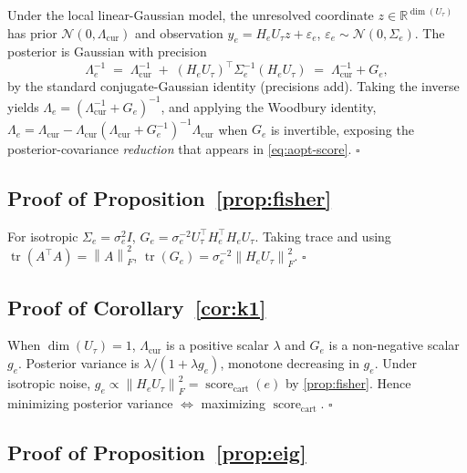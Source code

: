 \documentclass{article}
\newcommand{\scorecart}{\operatorname{score}_{\mathrm{cart}}}
\newcommand{\tr}{\operatorname{tr}}
\newcommand{\real}{\mathbb{R}}
\newcommand{\norm}[1]{\left\lVert #1 \right\rVert}
\theoremstyle{plain}
\theoremstyle{definition}
\theoremstyle{remark}
\begin{document}
Under the local linear-Gaussian model, the unresolved coordinate
$z\in\real^{\dim(U_\tau)}$ has prior $\mathcal{N}(0,\Lambda_{\mathrm{cur}})$
and observation $y_e=H_e U_\tau z+\varepsilon_e$,
$\varepsilon_e\sim\mathcal{N}(0,\Sigma_e)$. The posterior is Gaussian with
precision
\[
\Lambda_e^{-1}
\;=\; \Lambda_{\mathrm{cur}}^{-1}\;+\;(H_e U_\tau)^\top \Sigma_e^{-1}(H_e U_\tau)
\;=\; \Lambda_{\mathrm{cur}}^{-1}+G_e,
\]
by the standard conjugate-Gaussian identity (precisions add). Taking the
inverse yields $\Lambda_e=(\Lambda_{\mathrm{cur}}^{-1}+G_e)^{-1}$, and
applying the Woodbury identity,
$\Lambda_e=\Lambda_{\mathrm{cur}}-\Lambda_{\mathrm{cur}}(\Lambda_{\mathrm{cur}}+G_e^{-1})^{-1}\Lambda_{\mathrm{cur}}$
when $G_e$ is invertible, exposing the posterior-covariance \emph{reduction}
that appears in \eqref{eq:aopt-score}. \hfill$\square$

\subsection{Proof of Proposition~\ref{prop:fisher}}

For isotropic $\Sigma_e=\sigma_e^2 I$,
$G_e=\sigma_e^{-2}U_\tau^\top H_e^\top H_e U_\tau$. Taking trace and using
$\tr(A^\top A)=\norm{A}_F^2$, $\tr(G_e)=\sigma_e^{-2}\norm{H_e U_\tau}_F^2$.
\hfill$\square$

\subsection{Proof of Corollary~\ref{cor:k1}}

When $\dim(U_\tau)=1$, $\Lambda_{\mathrm{cur}}$ is a positive scalar
$\lambda$ and $G_e$ is a non-negative scalar $g_e$. Posterior variance is
$\lambda/(1+\lambda g_e)$, monotone decreasing in $g_e$. Under isotropic
noise, $g_e\propto\norm{H_e U_\tau}_F^2=\scorecart(e)$ by
\cref{prop:fisher}. Hence minimizing posterior variance $\Leftrightarrow$
maximizing $\scorecart$. \hfill$\square$

\subsection{Proof of Proposition~\ref{prop:eig}}
\end{document}
